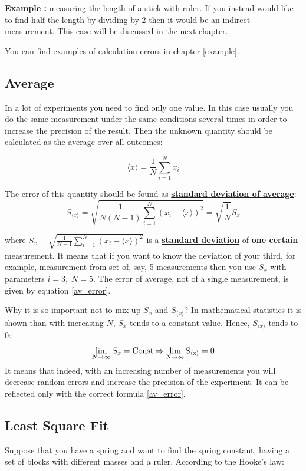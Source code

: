 \documentclass[12pt,a4paper]{article}
\newcommand{\definition}[1]{ \textcolor{MyRed}{\uline{\textbf {#1}}}}%
\newcommand{\example}[1]{\textcolor{MyBlue}{\textbf{Example {#1}: }}}
\begin{document}
\example{} measuring the length of a stick with ruler. If you instead would like to find half the length by dividing by 2 then it would be an indirect measurement. This case will be discussed in the next chapter.

You can find examples of calculation errors in chapter \ref{example}.

\subsection{Average}
In a lot of experiments you need to find only one value. In this case usually you do the same measurement under the same conditions several times in order to increase the precision of the result. Then the unknown quantity should be calculated as the average over all outcomes: 

\begin{equation}
\label{av}
\boxed{\langle x\rangle = \frac{1}{N}\sum_{i=1}^N x_i}
\end{equation}

The error of this quantity should be found as \definition{standard deviation of average}:
\begin{equation}
 \label{av_error}
\boxed{S_{\langle x\rangle} =\sqrt{ \frac{1}{N(N-1)}\sum_{i=1}^N (x_i-\langle x\rangle)^2} = \sqrt{\frac{1}{N}}S_x}
\end{equation}

where $S_x = \sqrt{ \frac{1}{N-1}\sum_{i=1}^N (x_i-\langle x\rangle)^2}$ is a \definition{standard deviation} of \textbf{one certain} measurement. It means that if you want to know the deviation of your third, for example, measurement from set of, say, 5 measurements then you use $S_x$ with parameters $i = 3,\;N=5$. The error of average, not of a single measurement, is given by equation \ref{av_error}.

Why it is so important not to mix up $S_x$ and $S_{\langle x\rangle}$? In mathematical statistics it is shown than with increasing $N$, $S_x$ tends to a constant value. Hence, $S_{\langle x\rangle}$ tends to 0:
\begin{equation}
\lim_{N\rightarrow\infty}S_x=\rm{Const} \Rightarrow \lim_{N\rightarrow\infty}S_{\langle x\rangle}=0
\end{equation}
It means that indeed, with an increasing number of measurements you will decrease random errors and increase the precision of the experiment. It can be reflected only with the correct formula \ref{av_error}.

\subsection{Least Square Fit}
Suppose that you have a spring and want to find the spring constant, having a set of blocks with different masses and a ruler. According to the Hooke's law:
\end{document}
